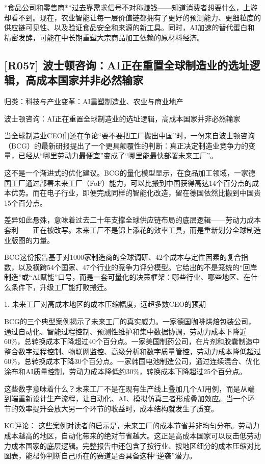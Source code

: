 \documentclass[11pt]{ctexart}
\begin{document}
*食品公司和零售商**过去靠需求信号不对称赚钱——知道消费者想要什么，上游却看不到。现在，农业智能让每一层价值链都拥有了更好的预测能力、更细粒度的供应链可见性、以及验证食品安全和来源的新工具。同时，AI加速的替代蛋白和精密发酵，可能在中长期重塑大宗商品加工依赖的原材料经济。

\subsection{[R057] 波士顿咨询：AI正在重置全球制造业的选址逻辑，高成本国家并非必然输家}
{\small\color{refgray}归类：科技与产业变革：AI重塑制造业、农业与商业地产}

波士顿咨询：AI正在重置全球制造业的选址逻辑，高成本国家并非必然输家

当全球制造业CEO们还在争论“要不要把工厂搬出中国”时，一份来自波士顿咨询（BCG）的最新研报提出了一个更具颠覆性的判断：真正决定制造业竞争力的变量，已经从“哪里劳动力最便宜”变成了“哪里能最快部署未来工厂”。

这不是一个渐进式的优化建议。BCG的量化模型显示，在食品加工领域，一家德国工厂通过部署未来工厂（FoF）能力，可以比搬到中国获得高达14个百分点的成本优势。而在电子行业，即便完成同样的智能化改造，留在德国依然比搬到中国贵15个百分点。

差异如此悬殊，意味着过去二十年支撑全球供应链布局的底层逻辑——劳动力成本套利——正在被改写。未来工厂不是锦上添花的效率工具，而是重新划分全球制造业版图的力量。

BCG这份报告基于对1000家制造商的全球调研、42个成本与定性因素的复合指数，以及横跨54个国家、47个行业的竞争力评分模型。它给出的不是笼统的“回岸制造”或“AI赋能”口号，而是一套可量化的决策框架：哪些行业、哪些地区、在什么条件下，升级工厂能打败搬迁。

1. 未来工厂对高成本地区的成本压缩幅度，远超多数CEO的预期

BCG的三个典型案例揭示了未来工厂的真实威力。一家德国咖啡烘焙包装公司，通过自动化、智能过程控制、预测性维护和集中数据协调，劳动力成本下降近60\%，总转换成本下降超过40个百分点。一家美国制药公司，在片剂和胶囊制造中整合数字过程控制、物联网监控、高级分析和数字质量管控，劳动力成本降低超过60\%，总转换成本下降30个百分点。一家韩国电池制造公司，通过连续混合、优化涂布和AI质量控制，劳动力成本降低约30\%，转换成本下降超过25个百分点。

这些数字意味着什么？未来工厂不是在现有生产线上叠加几个AI用例，而是从端到端重新设计生产流程，让自动化、AI、模拟仿真三者形成叠加效应。当一个环节的效率提升会放大另一个环节的收益时，成本结构就发生了质变。

KC评论： 这些案例对读者的启示是，未来工厂的成本节省并非均匀分布。劳动力成本越高的地区，自动化带来的绝对节省越大。这正是高成本国家可以反击低劳动力成本国家的底层逻辑。完整报告中还包含了按行业、按地区细分的成本压缩对比图表，能帮你判断自己所在的赛道是否具备这种“逆袭”潜力。
\end{document}
